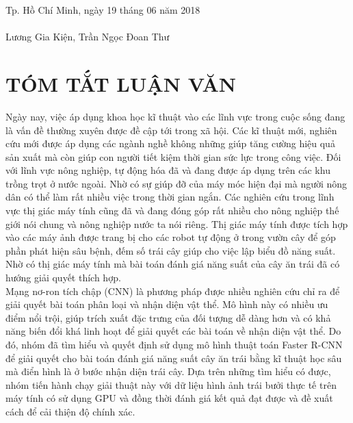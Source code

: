 \documentclass[a4paper,12pt,oneside]{ThesisStyle}
\begin{document}
\begin{flushright}
Tp. Hồ Chí Minh, ngày 19 tháng 06 năm 2018 \\
\hfill \\
Lương Gia Kiện, Trần Ngọc Đoan Thư
\end{flushright}

\cleardoublepage

\chapter*{TÓM TẮT LUẬN VĂN}
Ngày nay, việc áp dụng khoa học kĩ thuật vào các lĩnh vực trong cuộc sống đang là vấn đề thường xuyên được đề cập tới trong xã hội. Các kĩ thuật mới, nghiên cứu mới được áp dụng các ngành nghề không những giúp tăng cường hiệu quả sản xuất mà còn giúp con người tiết kiệm thời gian sức lực trong công việc. Đối với lĩnh vực nông nghiệp, tự động hóa đã và đang được áp dụng trên các khu trồng trọt ở nước ngoài. Nhờ có sự giúp đỡ của máy móc hiện đại mà người nông dân có thể làm rất nhiều việc trong thời gian ngắn.
Các nghiên cứu trong lĩnh vực thị giác máy tính cũng đã và đang đóng góp rất nhiều cho nông nghiệp thế giới nói chung và nông nghiệp nước ta nói riêng. Thị giác máy tính được tích hợp vào các máy ảnh được trang bị cho các robot tự động ở trong vườn cây để góp phần phát hiện sâu bệnh, đếm số trái cây giúp cho việc lập biểu đồ năng suất. Nhờ có thị giác máy tính mà bài toán đánh giá năng suất của cây ăn trái đã có hướng giải quyết thích hợp.
~\\

Mạng nơ-ron tích chập (CNN) là phương pháp được nhiều nghiên cứu chỉ ra để giải quyết bài toán phân loại và nhận diện vật thể. Mô hình này có nhiều ưu điểm nổi trội, giúp trích xuất đặc trưng của đối tượng dễ dàng hơn và có khả năng biến đổi khá linh hoạt để giải quyết các bài toán về nhận diện vật thể. Do đó, nhóm đã tìm hiểu và quyết định sử dụng mô hình thuật toán Faster R-CNN để giải quyết cho bài toán đánh giá năng suất cây ăn trái bằng kĩ thuật học sâu mà điển hình là ở bước nhận diện trái cây. Dựa trên những tìm hiểu có được, nhóm tiến hành chạy giải thuật này với dữ liệu hình ảnh trái bưởi thực tế trên máy tính có sử dụng GPU và đồng thời đánh giá kết quả đạt được và đề xuất cách để cải thiện độ chính xác.

\cleardoublepage

\renewcommand{\contentsname}{MỤC LỤC}
\renewcommand{\listfigurename}{MỤC LỤC HÌNH}
\renewcommand{\listtablename}{MỤC LỤC BẢNG}
\renewcommand{\figurename}{Hình}
\renewcommand{\tablename}{Bảng}
\end{document}
